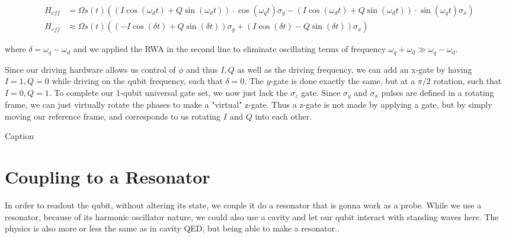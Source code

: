 \begin{fullwidth}
    
\begin{align}
H_{eff} &= \Omega s(t) \left((I \cos(\omega_d t) + Q \sin(\omega_d t)) \cdot \cos(\omega_q t)\sigma_y - \left(I \cos(\omega_d t) + Q \sin(\omega_d t)\right) \cdot \sin(\omega_q t) \sigma_x \right) \\
H_{eff} &\approx \Omega s(t) \left((-I \cos(\delta t) + Q \sin(\delta t))\sigma_y + \left(I \cos(\delta t) - Q \sin(\delta t)\right) \sigma_x \right)
\end{align}
\end{fullwidth}
where $\delta = \omega_q - \omega_d$ and we applied the RWA in the second line to eliminate oscillating terms of frequency $\omega_q + \omega_d \gg \omega_q - \omega_d$. 

Since our driving hardware allows us control of $\phi$ and thus $I, Q$ as well as the driving frequency, we can add an x-gate by having $I = 1, Q = 0$ while driving on the qubit frequency, such that $\delta = 0$. The $y$-gate is done exactly the same, but at a $\pi/2$ rotation, such that $I = 0, Q = 1$. 
To complete our 1-qubit universal gate set, we now just lack the $\sigma_z$ gate. Since $\sigma_y$ and $\sigma_x$ pulses are defined in a rotating frame, we can just virtually rotate the phases to make a "virtual" z-gate. Thus a z-gate is not made by applying a gate, but by simply moving our reference frame, and corresponds to us rotating $I$ and $Q$ into each other. \cite{krantz_quantum_2019}

\begin{marginfigure}[-5 cm]
    \centering
    \caption{Caption}
    \label{fig:control_virtual_z}
\end{marginfigure}


\section{Coupling to a Resonator}
In order to readout the qubit, without altering its state, we couple it do a resonator that is gonna work as a probe. While we use a resonator, because of its harmonic oscillator nature, we could also use a cavity and let our qubit interact with standing waves here. The physics is also more or less the same as in cavity QED, but being able to make a resonator..

